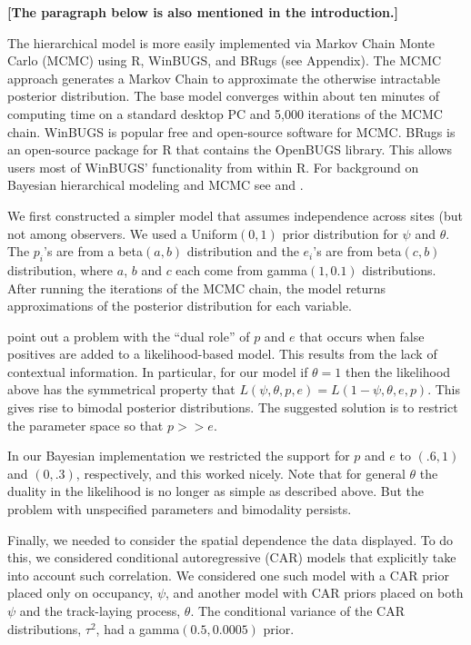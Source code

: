 \documentclass[11pt]{article}
\begin{document}
    \textbf{[The paragraph below is also mentioned in the introduction.]}

    The hierarchical model is more easily implemented via Markov Chain Monte
    Carlo (MCMC) using R, WinBUGS, and BRugs (see Appendix). The MCMC approach
    generates a Markov Chain to approximate the otherwise intractable posterior
    distribution.  The base model converges within about ten minutes of
    computing time on a standard desktop PC and 5,000 iterations of the MCMC
    chain.  WinBUGS is popular free and open-source software for MCMC. BRugs is
    an open-source package for R that contains the OpenBUGS library.  This
    allows users most of WinBUGS' functionality from within R.  For background
    on Bayesian hierarchical modeling and MCMC see \citet{Royle2008} and
    \citet{Ntzoufras2009}.

    We first constructed a simpler model that assumes independence across sites
    (but not among observers. We used a Uniform$(0,1)$ prior distribution for
    \(\psi\) and \(\theta\).  The \(p_i\)'s are from a beta\((a, b)\)
    distribution and the \(e_i\)'s are from beta\((c, b)\) distribution, where
    \(a\), \(b\) and \(c\) each come from gamma\((1, 0.1)\) distributions.
    After running the iterations of the MCMC chain, the model returns
    approximations of the posterior distribution for each variable.

    \citet{Royle2006} point out a problem with the ``dual role'' of $p$ and
    $e$ that occurs when false positives are added to a likelihood-based model.
    This results from the lack of contextual information.  In particular, for
    our model if $\theta =1$ then the likelihood above has the symmetrical
    property that $L(\psi, \theta, p, e) = L(1-\psi, \theta, e, p)$. This gives
    rise to bimodal posterior distributions. The suggested solution is to
    restrict the parameter space so that $p >> e$.

    In our Bayesian implementation we restricted the support for $p$ and $e$ to
    $(.6, 1)$ and $(0, .3)$, respectively, and this worked nicely. Note that
    for general $\theta$ the duality in the likelihood is no longer as simple
    as described above. But the problem with unspecified parameters and
    bimodality persists.

    Finally, we needed to consider the spatial dependence the data displayed.
    To do this, we considered conditional autoregressive (CAR) models that
    explicitly take into account such correlation. We considered one such model
    with a CAR prior placed only on occupancy, $\psi$, and another model with
    CAR priors placed on both $\psi$ and the track-laying process, $\theta$.
    The conditional variance of the CAR distributions, $\tau^2$, had a
    gamma$(0.5,0.0005)$ prior.
\end{document}
